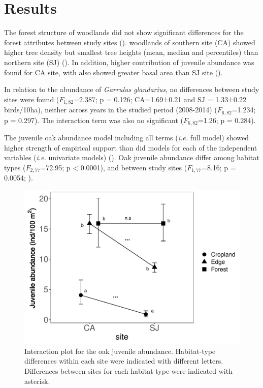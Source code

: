 \section{Results}\label{sec:coloniza:results}

The forest structure of \Qpy woodlands did not show significant differences for the forest attributes between study sites  (). \Qpy woodlands of southern site (CA) showed higher tree density but smallest tree heights (mean, median and percentiles) than northern site (SJ) (). In addition, higher contribution of juvenile abundance was found for CA site, with also showed greater basal area than SJ site ().


In relation to the abundance of \emph{Garrulus glandarius}, no differences between study sites were found (\(F_{1,82}\)=2.387; p = 0.126; CA=1.69±0.21 and SJ = 1.33±0.22 birds/10ha), neither across years in the studied period (2008-2014) (\(F_{6,82}\)=1.234; p = 0.297). The interaction term was also no significant (\(F_{6,82}\)=1.26; p = 0.284).

The juvenile oak abundance model including all terms (\emph{i.e.} full model) showed higher strength of empirical support than did models for each of the independent variables (\emph{i.e.} univariate models) (). Oak juvenile abundance differ among habitat types (\(F_{2,77}\)=72.95; p < 0.0001), and between study sites (\(F_{1,77}\)=8.16; p = 0.0054; ). 



\begin{figure}
    \centering
    \includegraphics[width=\textwidth]{img/coloniza/coloniza-juvenile-interaction.pdf}
    \caption{Interaction plot for the oak juvenile abundance. Habitat-type differences within each site were indicated with different letters. Differences between sites for each habitat-type were indicated with asterisk.}
    \label{fig:coloniza:interaction}
\end{figure}

